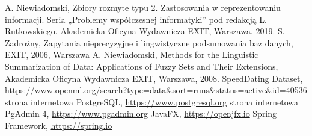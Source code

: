 \documentclass{classrep}
\begin{document}
\begin{thebibliography}{99}
  A. Niewiadomski, Zbiory rozmyte typu 2. Zastosowania w reprezentowaniu informacji.  Seria „Problemy współczesnej informatyki” pod redakcją L. Rutkowskiego. Akademicka Oficyna Wydawnicza EXIT, Warszawa, 2019.
 S. Zadrożny, Zapytania nieprecyzyjne i lingwistyczne podsumowania baz danych, EXIT, 2006, Warszawa
 A. Niewiadomski, Methods for the Linguistic Summarization of Data: Applications of Fuzzy Sets and Their Extensions, Akademicka Oficyna Wydawnicza EXIT, Warszawa, 2008.
 SpeedDating Dataset, \url{https://www.openml.org/search?type=data&sort=runs&status=active&id=40536}
 strona internetowa PostgreSQL, \url{https://www.postgresql.org}
 strona internetowa PgAdmin 4, \url{https://www.pgadmin.org}
 JavaFX, \url{https://openjfx.io}
 Spring Framework, \url{https://spring.io}

\end{thebibliography}

\end{document}
